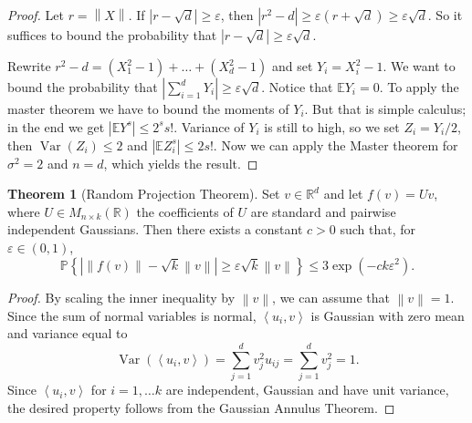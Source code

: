\documentclass{article}
\theoremstyle{definition}
\newtheorem{theorem}{Theorem}[section]
\begin{document}
  \begin{proof}
    Let \( r = \left\| X \right\| \). If \( \left| r - \sqrt{d} \right|
    \geq \varepsilon \), then \( \left| r^2 - d \right| \geq
      \varepsilon \left( r + \sqrt{d} \right) \geq \varepsilon \sqrt{d}
    \). So it suffices to bound the probability that \( \left| r -
    \sqrt{d} \right| \geq \varepsilon \sqrt{d} \).

    Rewrite \( r^2 - d = (X_{1}^{2} - 1) + \dots + (X_{d}^{2} - 1)\)
    and set \( Y_i = X_{i}^{2} - 1 \). We want to bound the probability
    that \( \left| \sum_{i=1}^{d} Y_i \right| \geq \varepsilon \sqrt{d}
    \). Notice that \( \mathbb{E} Y_i = 0\). To apply the master
    theorem we have to bound the moments of \( Y_i \). But that is
    simple calculus; in the end we get \( \left| \mathbb{E} Y^{s}
    \right| \leq 2^{s}s! \).
    Variance of \( Y_i \) is still to high, so we set \( Z_i = Y_i / 2
    \), then \( \operatorname{Var}(Z_i) \leq 2 \) and \( \left|
    \mathbb{E}Z_{i}^{s} \right| \leq 2s! \). Now we can apply the
    Master theorem for \( \sigma^2 = 2 \) and \( n = d \), which yields
    the result.
  \end{proof}

  \begin{theorem}[Random Projection Theorem]
    Set \( v \in \mathbb{R}^d \) and let \( f(v) = Uv \), where \( U
    \in M_{n \times k}(\mathbb{R}) \) the coefficients of \( U \) are
    standard and pairwise independent Gaussians. Then there exists a
    constant \( c > 0 \) such that, for \( \varepsilon \in (0,1) \),
    \[
      \mathbb{P}\left\{ \left| \left\| f(v) \right\| - \sqrt{k} \left\| v
        \right\| \right| \geq \varepsilon \sqrt{k} \left\| v \right\|
      \right\}  \leq 3 \exp\left(-ck \varepsilon^2\right).
    \]
  \end{theorem}

  \begin{proof}
    By scaling the inner inequality by \( \left\| v \right\| \), we can
    assume that \( \left\| v \right\| = 1 \). Since the sum of normal
    variables is normal, \( \left\langle u_i, v \right\rangle \) is
    Gaussian with zero mean and variance equal to
    \[
      \operatorname{Var}(\left\langle u_i, v \right\rangle) =
      \sum_{j=1}^{d} v_{j}^{2} u_{ij} = \sum_{j=1}^{d} v_{j}^{2} = 1.
    \]
    Since \( \left\langle u_{i}, v \right\rangle \) for \( i=1, \dots k \) are
    independent, Gaussian and have unit variance, the desired property
    follows from the Gaussian Annulus Theorem.
  \end{proof}
\end{document}
